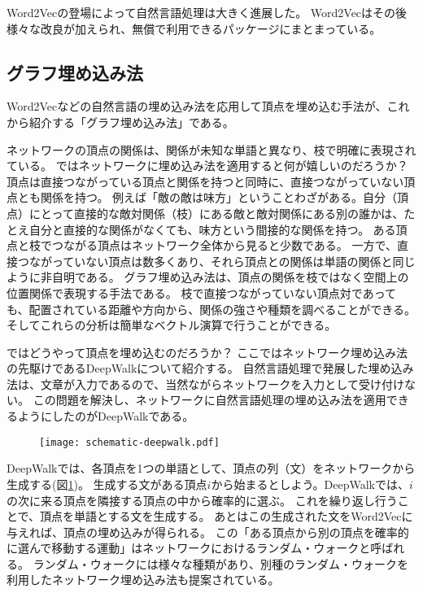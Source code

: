 \documentclass[J]{scitrans}
\begin{document}
Word2Vecの登場によって自然言語処理は大きく進展した。
Word2Vecはその後様々な改良が加えられ\cite{Levy2014,pennington-etal-2014-glove,joulin2016fasttext,Bojanowski2017}、無償で利用できるパッケージにまとまっている\cite{gensim}。

\subsection{グラフ埋め込み法}

Word2Vecなどの自然言語の埋め込み法を応用して頂点を埋め込む手法が、これから紹介する「グラフ埋め込み法」である。

ネットワークの頂点の関係は、関係が未知な単語と異なり、枝で明確に表現されている。
ではネットワークに埋め込み法を適用すると何が嬉しいのだろうか？
頂点は直接つながっている頂点と関係を持つと同時に、直接つながっていない頂点とも関係を持つ。
例えば「敵の敵は味方」ということわざがある。自分（頂点）にとって直接的な敵対関係（枝）にある敵と敵対関係にある別の誰かは、たとえ自分と直接的な関係がなくても、味方という間接的な関係を持つ。
ある頂点と枝でつながる頂点はネットワーク全体から見ると少数である。
一方で、直接つながっていない頂点は数多くあり、それら頂点との関係は単語の関係と同じように非自明である。
グラフ埋め込み法は、頂点の関係を枝ではなく空間上の位置関係で表現する手法である。
枝で直接つながっていない頂点対であっても、配置されている距離や方向から、関係の強さや種類を調べることができる。
そしてこれらの分析は簡単なベクトル演算で行うことができる。

ではどうやって頂点を埋め込むのだろうか？
ここではネットワーク埋め込み法の先駆けであるDeepWalkについて紹介する。
自然言語処理で発展した埋め込み法は、文章が入力であるので、当然ながらネットワークを入力として受け付けない。
この問題を解決し、ネットワークに自然言語処理の埋め込み法を適用できるようにしたのがDeepWalk\cite{Bryan2014}である。

\begin{figure}
    \centering
    \texttt{[image: schematic-deepwalk.pdf]}
    \caption{
    }
    \label{fig:deepwalk}
\end{figure}

DeepWalkでは、各頂点を1つの単語として、頂点の列（文）をネットワークから生成する(図\ref{fig:deepwalk})。
生成する文がある頂点$i$から始まるとしよう。DeepWalkでは、$i$の次に来る頂点を隣接する頂点の中から確率的に選ぶ。
これを繰り返し行うことで、頂点を単語とする文を生成する。
あとはこの生成された文をWord2Vecに与えれば、頂点の埋め込みが得られる。
この「ある頂点から別の頂点を確率的に選んで移動する運動」はネットワークにおけるランダム・ウォークと呼ばれる。
ランダム・ウォークには様々な種類があり、別種のランダム・ウォークを利用したネットワーク埋め込み法も提案されている\cite{Grover2016,Dong2017}。
\end{document}
